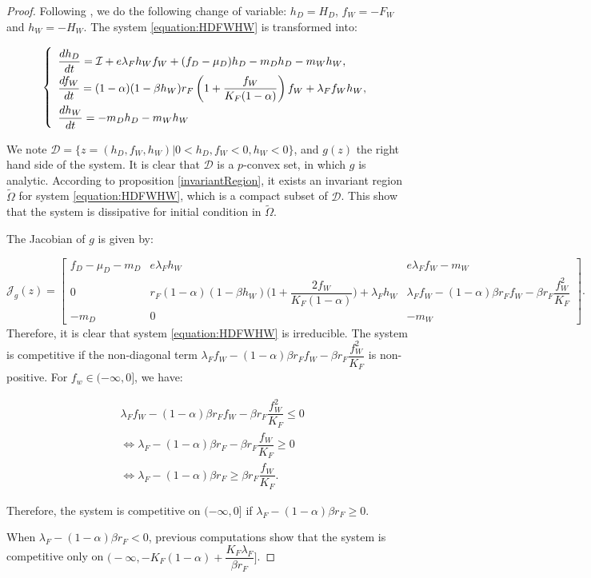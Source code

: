 \documentclass{article}
\newcommand{\lfw}{\lambda_{F}}
\newcommand{\lfw}{\lambda_{F}}
\newcommand{\cI}{\mathcal{I}}
\begin{document}
\begin{proof}
Following \cite{wang_predator-prey_1997}, we do the following change of variable: $h_D =  H_D$, $f_W = -F_W$ and $h_W = -H_W$. The system \eqref{equation:HDFWHW} is transformed into:

\begin{equation}
\def\arraystretch{2}
\left\{ \begin{array}{l}
\dfrac{dh_D}{dt}= \cI + e\lfw h_W f_W + (f_D - \mu_D) h_D - m_D h_D - m_W h_W, \\
\dfrac{df_W}{dt} = (1-\alpha)(1 - \beta h_W) r_F \left(1 + \dfrac{f_W}{K_F(1-\alpha)} \right) f_W + \lfw f_W h_W, \\
\dfrac{dh_W}{dt}= -m_D h_D - m_W h_W 
\end{array} \right.
\label{equation:hdfwhw}
\end{equation}


We note $\mathcal{D} = \Big\{z = (h_D, f_W, h_W) | 0 < h_D, f_W < 0, h_W < 0 \Big\}$, and $g(z)$ the right hand side of the system. It is clear that $\mathcal{D}$ is a $p$-convex set, in which $g$ is analytic. According to proposition \ref{invariantRegion}, it exists an invariant region $\tilde{\Omega}$ for system \eqref{equation:HDFWHW}, which is a compact subset of $\mathcal{D}$. This show that the system is dissipative for initial condition in  $\tilde{\Omega}$.

The Jacobian of $g$ is given by:

\begin{equation*}
\mathcal{J}_g(z) = \begin{bmatrix}
f_D -\mu_D - m_D & e \lfw h_W & e \lfw f_W - m_W \\
0 & r_F (1-\alpha)(1-\beta h_W) \Big(1 + \dfrac{2 f_W}{K_F(1-\alpha)}\Big) + \lfw  h_W & \lfw f_W - (1-\alpha)\beta r_F f_W - \beta r_F \dfrac{f_W^2}{K_F}\\
-m_D & 0 & -m_W
\end{bmatrix}.
\end{equation*}
Therefore, it is clear that system \eqref{equation:HDFWHW} is irreducible. The system is competitive if the non-diagonal term $\lfw f_W - (1-\alpha)\beta r_F f_W - \beta r_F \dfrac{f_W^2}{K_F}$ is non-positive. For $f_w \in (-\infty, 0]$, we have:

\begin{align*}
&\lfw f_W - (1-\alpha)\beta r_F f_W - \beta r_F \dfrac{f_W^2}{K_F} \leq 0 \\
&\Leftrightarrow \lfw - (1-\alpha)\beta r_F - \beta r_F \dfrac{f_W}{K_F} \geq 0 \\
&\Leftrightarrow \lfw - (1-\alpha)\beta r_F \geq \beta r_F \dfrac{f_W}{K_F}.
\end{align*}

Therefore, the system is competitive on $(-\infty, 0]$ if $\lfw - (1-\alpha)\beta r_F \geq 0$. 

When $\lfw - (1-\alpha)\beta r_F<0$, previous computations show that the system is competitive only on $\Big(-\infty, -K_F(1-\alpha) + \dfrac{K_F \lfw}{\beta r_F}\Big]$. 





\end{proof}
\end{document}
